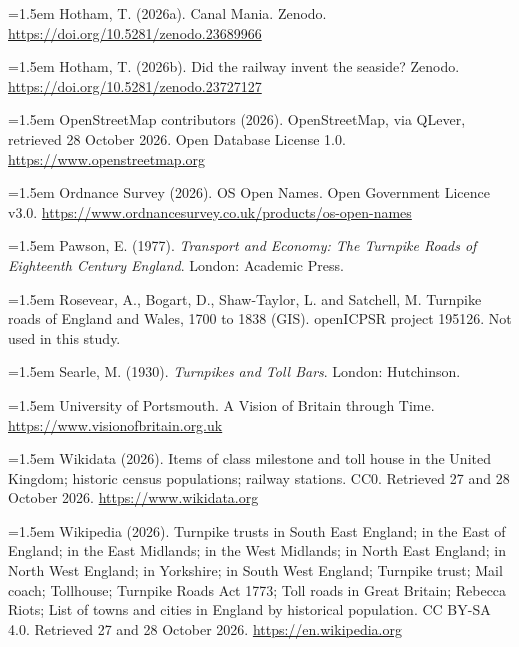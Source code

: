 \documentclass[11pt,a4paper]{article}
\begin{document}
\hangindent=1.5em Hotham, T. (2026a). Canal Mania. Zenodo. \url{https://doi.org/10.5281/zenodo.23689966}

\hangindent=1.5em Hotham, T. (2026b). Did the railway invent the seaside? Zenodo. \url{https://doi.org/10.5281/zenodo.23727127}

\hangindent=1.5em OpenStreetMap contributors (2026). OpenStreetMap, via QLever, retrieved 28 October 2026. Open Database License 1.0. \url{https://www.openstreetmap.org}

\hangindent=1.5em Ordnance Survey (2026). OS Open Names. Open Government Licence v3.0. \url{https://www.ordnancesurvey.co.uk/products/os-open-names}

\hangindent=1.5em Pawson, E. (1977). \textit{Transport and Economy: The Turnpike Roads of Eighteenth Century England}. London: Academic Press.

\hangindent=1.5em Rosevear, A., Bogart, D., Shaw-Taylor, L. and Satchell, M. Turnpike roads of England and Wales, 1700 to 1838 (GIS). openICPSR project 195126. Not used in this study.

\hangindent=1.5em Searle, M. (1930). \textit{Turnpikes and Toll Bars}. London: Hutchinson.

\hangindent=1.5em University of Portsmouth. A Vision of Britain through Time. \url{https://www.visionofbritain.org.uk}

\hangindent=1.5em Wikidata (2026). Items of class milestone and toll house in the United Kingdom; historic census populations; railway stations. CC0. Retrieved 27 and 28 October 2026. \url{https://www.wikidata.org}

\hangindent=1.5em Wikipedia (2026). Turnpike trusts in South East England; in the East of England; in the East Midlands; in the West Midlands; in North East England; in North West England; in Yorkshire; in South West England; Turnpike trust; Mail coach; Tollhouse; Turnpike Roads Act 1773; Toll roads in Great Britain; Rebecca Riots; List of towns and cities in England by historical population. CC BY-SA 4.0. Retrieved 27 and 28 October 2026. \url{https://en.wikipedia.org}
\end{document}
